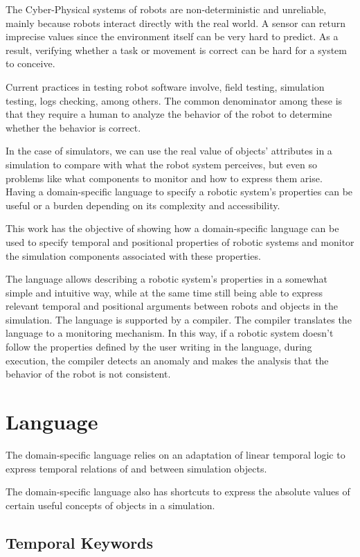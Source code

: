\documentclass[runningheads]{llncs}
\begin{document}
The Cyber-Physical systems of robots are non-deterministic and unreliable, mainly because robots interact directly with the real world. A sensor can return imprecise values since the environment itself can be very hard to predict. As a result, verifying whether a task or movement is correct can be hard for a system to conceive.

Current practices in testing robot software involve, field testing, simulation testing, logs checking, among others. The common denominator among these is that they require a human to analyze the behavior of the robot to determine whether the behavior is correct.

In the case of simulators, we can use the real value of objects' attributes in a simulation to compare with what the robot system perceives, but even so problems like what components to monitor and how to express them arise. Having a domain-specific language to specify a robotic system's properties can be useful or a burden depending on its complexity and accessibility.

This work has the objective of showing how a domain-specific language can be used to specify temporal and positional properties of robotic systems and monitor the simulation components associated with these properties.

The language allows describing a robotic system's properties in a somewhat simple and intuitive way, while at the same time still being able to express relevant temporal and positional arguments between robots and objects in the simulation. The language is supported by a compiler. The compiler translates the language to a monitoring mechanism. In this way, if a robotic system doesn't follow the properties defined by the user writing in the language, during execution, the compiler detects an anomaly and makes the analysis that the behavior of the robot is not consistent.

\section{Language}

The domain-specific language relies on an adaptation of linear temporal logic to express temporal relations of and between simulation objects.

The domain-specific language also has shortcuts to express the absolute values of certain useful concepts of objects in a simulation.

\subsection{Temporal Keywords}
\end{document}
